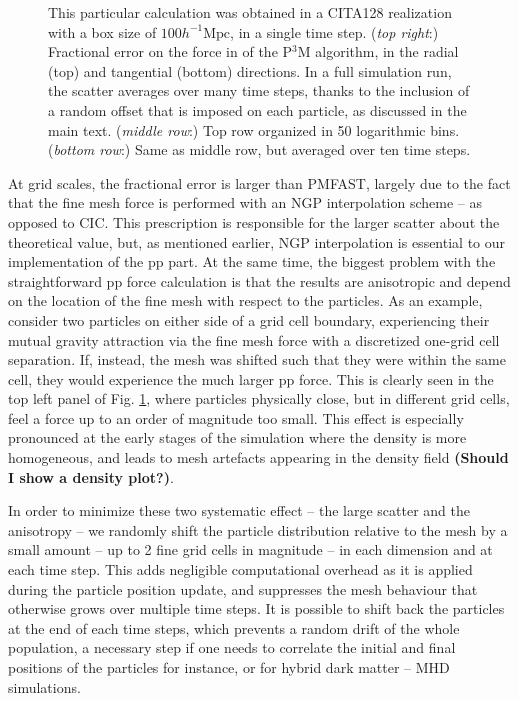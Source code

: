 \begin{figure}
\begin{center}
{    This particular calculation was obtained in a CITA128 realization with  a box size of $100 h^{-1}\mbox{Mpc}$,
    in a single time step. 
    ({\it top right}:) Fractional error on the force in of the P$^3$M algorithm, in the radial (top) and tangential (bottom) directions.
  In a full simulation run, the scatter averages over many time steps, 
    thanks to the inclusion of a random offset that is imposed on each particle, as discussed in the main text.
    ({\it middle row}:) Top row organized in 50 logarithmic bins.  
    ({\it bottom row}:) Same as middle row, but averaged over ten time steps.
    \label{fig:den_force_fracErr}}
\end{center}
\end{figure}

At grid scales, the fractional error is larger than {\small PMFAST}, largely due to the fact that the fine mesh force is performed with an NGP interpolation scheme -- as opposed to CIC. This prescription is responsible for the larger scatter about the theoretical value, but, as mentioned earlier, 
NGP interpolation is essential to our implementation of the pp part.
At the same time, the biggest problem with the straightforward pp force calculation is that the results 
are anisotropic and depend on the location of the fine mesh with respect 
to the particles. As an example, consider two particles on either side of a grid 
cell boundary, experiencing their mutual gravity attraction via the fine mesh force with a discretized one-grid cell separation.
 If, instead, the mesh was shifted such that they were
within the same cell, they would experience the much larger pp force. 
This is clearly seen in the top left panel of Fig. \ref{fig:den_force_fracErr}, where particles physically close, but in different grid cells, 
feel a force up to an order of magnitude too small.
This effect is especially pronounced at the early stages of the simulation where
the density is more homogeneous, and leads to mesh artefacts appearing
in the density field {\bf (Should I show a density plot?)}.

In order to minimize these two systematic effect -- the large scatter and the anisotropy -- 
we randomly shift the particle distribution relative to the mesh by a small
amount -- up to 2 fine grid cells in magnitude -- in each
dimension and at each time step.  This adds negligible computational
overhead as it is applied during the particle position update,
and suppresses the mesh behaviour that otherwise grows over multiple time steps.
It is possible to shift back the particles at the end of each time steps,
which prevents a random drift of the whole population, a necessary step 
if one needs to correlate the initial and final positions of the particles for instance,
or for hybrid dark matter -- MHD simulations.
 
